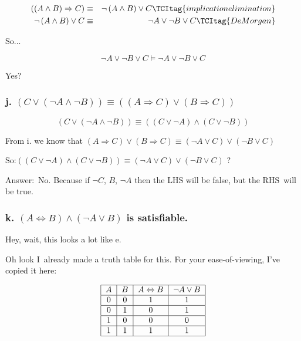 \documentclass{article}
\begin{document}
\begin{eqnarray}
\left( \left( A\wedge B\right) \Rightarrow C\right)  &\equiv &\lnot \left(
A\wedge B\right) \vee C  \TCItag{implication elimination} \\
\lnot \left( A\wedge B\right) \vee C &\equiv &\lnot A\vee \lnot B\vee C 
\TCItag{De Morgan}
\end{eqnarray}

So...

\[
\lnot A\vee \lnot B\vee C\models \lnot A\vee \lnot B\vee C
\]

Yes?

\subsubsection{j. $\left( C\vee \left( \lnot A\wedge \lnot B\right) \right)
\equiv \left( \left( A\Rightarrow C\right) \vee \left( B\Rightarrow C\right)
\right) $}

\begin{equation}
\left( C\vee \left( \lnot A\wedge \lnot B\right) \right) \equiv \left(
\left( C\vee \lnot A\right) \wedge \left( C\vee \lnot B\right) \right)  
\tag{distributivity of $\vee $ over $\wedge $}
\end{equation}

From i. we know that $\left( A\Rightarrow C\right) \vee \left( B\Rightarrow
C\right) \equiv \left( \lnot A\vee C\right) \vee \left( \lnot B\vee C\right) 
$

So:$\left( \left( C\vee \lnot A\right) \wedge \left( C\vee \lnot B\right)
\right) \equiv \left( \lnot A\vee C\right) \vee \left( \lnot B\vee C\right) $
?

Answer:\ No. Because if $\lnot C$, $B$, $\lnot A$ then the LHS will be
false, but the RHS\ will be true. 

\subsubsection{k. $\left( A\Leftrightarrow B\right) \wedge \left( \lnot
A\vee B\right) $ is satisfiable.}

Hey, wait, this looks a lot like e.

Oh look I\ already made a truth table for this. For your ease-of-viewing,
I've copied it here:

\[
\begin{tabular}{|c|c|c|c|}
\hline
$A$ & $B$ & $A\Leftrightarrow B$ & $\lnot A\vee B$ \\ \hline
0 & 0 & 1 & 1 \\ \hline
0 & 1 & 0 & 1 \\ \hline
1 & 0 & 0 & 0 \\ \hline
1 & 1 & 1 & 1 \\ \hline
\end{tabular}%
\]
\end{document}
